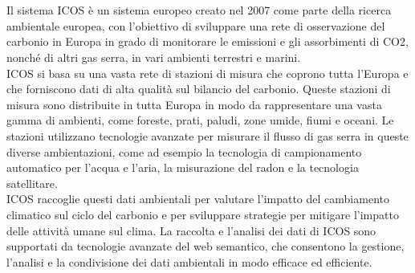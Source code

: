 \documentclass[12pt,a4paper,openright,twoside]{book}
\begin{document}
	
\frontmatter






\tableofcontents   
\listoffigures     %
\lstlistoflistings %

\mainmatter

\chapter{\introductionname}
\label{chap:introduction}

Il sistema ICOS è un sistema europeo creato nel 2007 come parte della ricerca 
ambientale europea, con l'obiettivo di sviluppare una rete di osservazione del carbonio in Europa
in grado di monitorare le emissioni e gli assorbimenti di CO2, nonché di altri gas serra,
in vari ambienti terrestri e marini.\\

ICOS si basa su una vasta rete di stazioni di misura che coprono tutta l'Europa e che forniscono 
dati di alta qualità sul bilancio del carbonio. Queste stazioni di misura sono distribuite in 
tutta Europa in modo da rappresentare una vasta gamma di ambienti, come foreste, prati, paludi,
zone umide, fiumi e oceani. Le stazioni utilizzano tecnologie avanzate per misurare il flusso
di gas serra in queste diverse ambientazioni, come ad esempio la tecnologia di campionamento 
automatico per l'acqua e l'aria, la misurazione del radon e la tecnologia satellitare.\\

ICOS raccoglie questi dati ambientali per valutare l'impatto del cambiamento climatico
sul ciclo del carbonio e per sviluppare strategie per mitigare l'impatto delle attività
umane sul clima. La raccolta e l'analisi dei dati di ICOS sono supportati da tecnologie 
avanzate del web semantico, che consentono la gestione, l'analisi e la condivisione dei dati 
ambientali in modo efficace ed efficiente.\\
\end{document}
